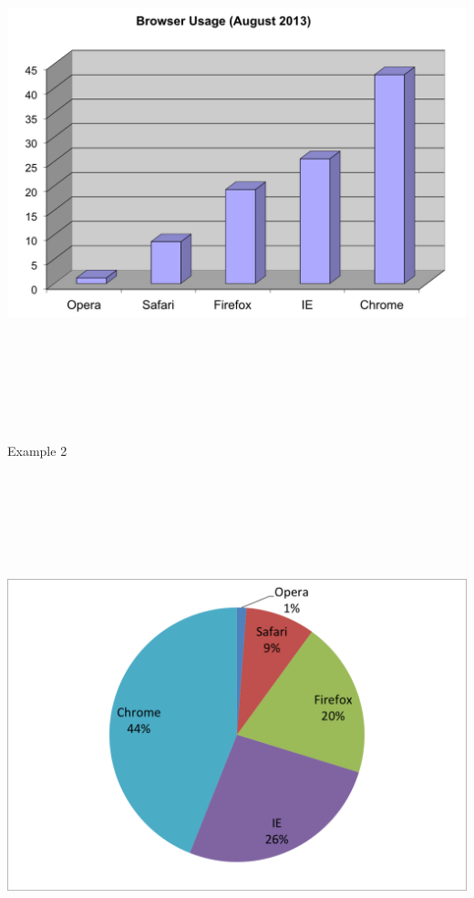 \documentclass[12pt]{article}
\newcommand{\headsize}{\fontsize{35}{35} \selectfont}
\begin{document}
\centerline{\includegraphics[height=6in]{Figs/fig2b.png}}



\newpage


\headsize \color{myyellow}
\hfill \begin{minipage}{5.75in}
\centering
Example 2
\end{minipage}

\vspace{30mm}

\centerline{\includegraphics[height=6in]{Figs/fig2c.png}}
\end{document}
